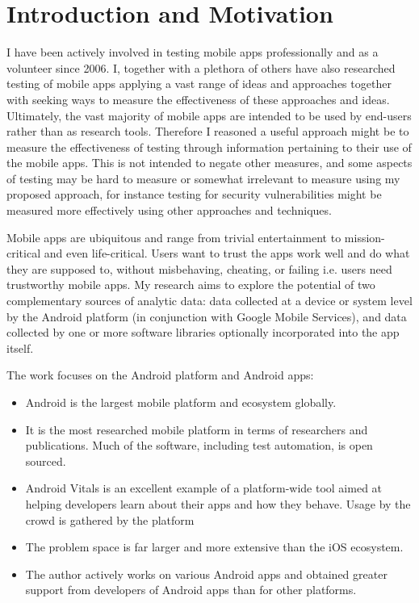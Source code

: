 \chapter{Introduction and Motivation}
I have been actively involved in testing mobile apps professionally and as a volunteer since 2006. I, together with a plethora of others have also researched testing of mobile apps applying a vast range of ideas and approaches together with seeking ways to measure the effectiveness of these approaches and ideas. Ultimately, the vast majority of mobile apps are intended to be used by end-users rather than as research tools. Therefore I reasoned a useful approach might be to measure the effectiveness of testing through information pertaining to their use of the mobile apps. This is not intended to negate other measures, and some aspects of testing may be hard to measure or somewhat irrelevant to measure using my proposed approach, for instance testing for security vulnerabilities might be measured more effectively using other approaches and techniques.

Mobile apps are ubiquitous and range from trivial entertainment to mission-critical and even life-critical. Users want to trust the apps work well and do what they are supposed to, without misbehaving, cheating, or failing i.e. users need trustworthy mobile apps. My research aims to explore the potential of two complementary sources of analytic data: data collected at a device or system level by the Android platform (in conjunction with Google Mobile Services), and data collected by one or more software libraries optionally incorporated into the app itself. 

The work focuses on the Android platform and Android apps:
\begin{itemize}
    \item Android is the largest mobile platform and ecosystem globally.
    \item It is the most researched mobile platform in terms of researchers and publications. Much of the software, including test automation, is open sourced.
    \item Android Vitals is an excellent example of a platform-wide tool aimed at helping developers learn about their apps and how they behave. Usage by the crowd is gathered by the platform
    \item The problem space is far larger and more extensive than the iOS ecosystem.
    \item The author actively works on various Android apps and obtained greater support from developers of Android apps than for other platforms.
\end{itemize}

